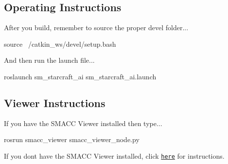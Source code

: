 \subsection*{Operating Instructions}

After you build, remember to source the proper devel folder...


\begin{DoxyCode}
source ~/catkin\_ws/devel/setup.bash
\end{DoxyCode}


And then run the launch file...


\begin{DoxyCode}
roslaunch sm\_starcraft\_ai sm\_starcraft\_ai.launch
\end{DoxyCode}


\subsection*{Viewer Instructions}

If you have the S\+M\+A\+CC Viewer installed then type...


\begin{DoxyCode}
rosrun smacc\_viewer smacc\_viewer\_node.py
\end{DoxyCode}


If you don\textquotesingle{}t have the S\+M\+A\+CC Viewer installed, click \href{http://smacc.ninja/smacc-viewer/}{\tt here} for instructions. 
